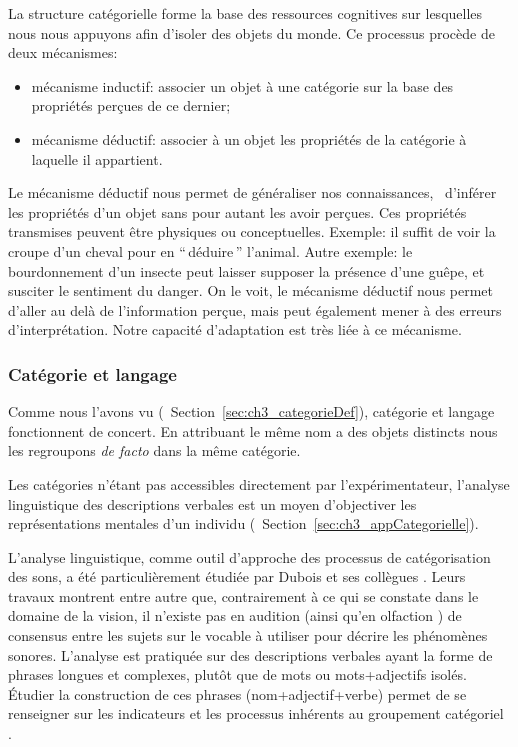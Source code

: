 {La structure catégorielle forme la base des ressources cognitives sur lesquelles nous nous appuyons afin d'isoler des objets du monde. Ce processus procède de deux mécanismes:

\begin{itemize} 
\item mécanisme inductif: associer un objet à une catégorie sur la base des propriétés perçues de ce dernier;
\item mécanisme déductif: associer à un objet les propriétés de la catégorie à laquelle il appartient.
\end{itemize}

Le mécanisme déductif nous permet de généraliser nos connaissances, \ie~d'inférer les propriétés d'un objet sans pour autant les avoir perçues. Ces propriétés transmises peuvent être physiques ou conceptuelles. Exemple: il suffit de voir la croupe d'un cheval pour en ``\,déduire\,'' l'animal. Autre exemple: le bourdonnement d'un insecte peut laisser supposer la présence d'une guêpe, et susciter le sentiment du danger. On le voit, le mécanisme déductif nous permet d'aller au delà de l'information perçue, mais peut également mener à des erreurs d'interprétation. Notre capacité d’adaptation est très liée à ce mécanisme.

\subsubsection{Catégorie et langage}
\label{sec:ch3_catLang}

Comme nous l'avons vu (\cf~Section~\ref{sec:ch3_categorieDef}), catégorie et langage fonctionnent de concert. En attribuant le même nom a des objets distincts nous les regroupons \emph{de facto} dans la même catégorie.

Les catégories n'étant pas accessibles directement par l'expérimentateur, l'analyse linguistique des descriptions verbales est un moyen d'objectiver les représentations mentales d'un individu (\cf~Section~\ref{sec:ch3_appCategorielle}).

L'analyse linguistique, comme outil d'approche des processus de catégorisation des sons, a été particulièrement étudiée par Dubois et ses collègues \citep{dubois2000categories,raimbault2005urban,dubois2006cognitive,guastavino2006ideal}. Leurs travaux montrent entre autre que, contrairement à ce qui se constate dans le domaine de la vision, il n'existe pas en audition (ainsi qu'en olfaction \citep{dubois2000categories}) de consensus entre les sujets sur le vocable à utiliser pour décrire les phénomènes sonores. L'analyse est pratiquée sur des descriptions verbales ayant la forme de phrases longues et complexes, plutôt que de mots ou mots+adjectifs isolés. Étudier la construction de ces phrases (nom+adjectif+verbe) permet de se renseigner sur les indicateurs et les processus inhérents au groupement catégoriel \citep{dubois2000categories,guastavino2006ideal}.

}
